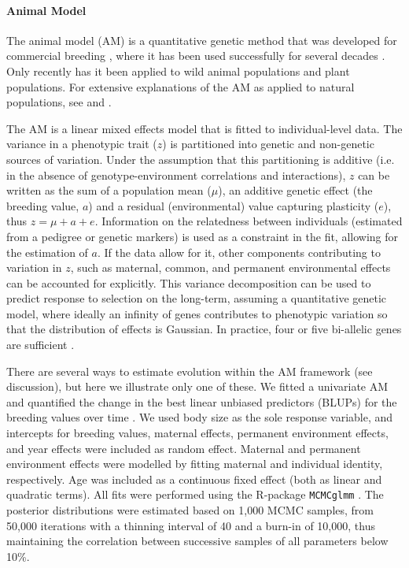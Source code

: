 \paragraph{Animal Model} 
The animal model (AM) is a quantitative genetic method that was developed for commercial breeding \parencite{Henderson1950,Henderson1976}, where it has been used successfully for several decades \parencite[e.g.][]{Lynch1998}. Only recently has it been applied to wild animal populations \parencite[e.g.][]{reale2003,Postma2014} and plant \parencite{Stinchcombe2014} populations. For extensive explanations of the AM as applied to natural populations, see \cite{Kruuk2004} and \cite{Wilson2009}. 

The AM is a linear mixed effects model that is fitted to individual-level data. The variance in a phenotypic trait ($z$) is partitioned into genetic and non-genetic sources of variation. Under the assumption that this partitioning is additive (i.e. in the absence of genotype-environment correlations and interactions), $z$ can be written as the sum of a population mean ($\mu$), an additive genetic effect (the breeding value, $a$) and a residual (environmental) value capturing plasticity ($e$), thus $z=\mu+a+e$. Information on the relatedness between individuals (estimated from a pedigree or genetic markers) is used as a constraint in the fit, allowing for the estimation of $a$. If the data allow for it, other components contributing to variation in $z$, such as maternal, common, and permanent environmental effects can be accounted for explicitly. This variance decomposition can be used to predict response to selection on the long-term, assuming a quantitative genetic model, where ideally an infinity of genes contributes to phenotypic variation so that the distribution of effects is Gaussian. In practice, four or five bi-allelic genes are sufficient \parencite{Roff2007}.

There are several ways to estimate evolution within the AM framework (see discussion), but here we illustrate only one of these. We fitted a univariate AM and quantified the change in the best linear unbiased predictors (BLUPs) for the breeding values over time \parencite[][and references therein]{Postma2006,Hadfield2010}. We used body size as the sole response variable, and intercepts for breeding values, maternal effects, permanent environment effects, and year effects were included as random effect. Maternal and permanent environment effects were modelled by fitting maternal and individual identity, respectively. Age was included as a continuous fixed effect (both as linear and quadratic terms). All fits were performed using the R-package \texttt{MCMCglmm} \parencite{Hadfield2010}. The posterior distributions were estimated based on 1,000 MCMC samples, from 50,000 iterations with a thinning interval of 40 and a burn-in of 10,000, thus maintaining the correlation between successive samples of all parameters below 10\%. 

